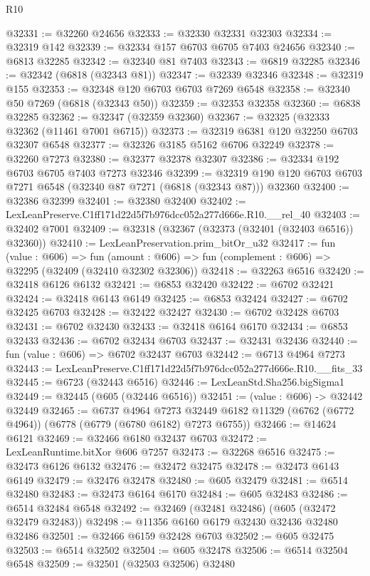 \begin{lexlean}{R10}
\begin{coremodule}
@32331 := @32260 @24656
@32333 := @32330 @32331 @32303
@32334 := @32319 @142
@32339 := @32334 @157 @6703 @6705 @7403 @24656
@32340 := @6813 @32285
@32342 := @32340 @81 @7403
@32343 := @6819 @32285
@32346 := @32342 (@6818 (@32343 @81))
@32347 := @32339 @32346
@32348 := @32319 @155
@32353 := @32348 @120 @6703 @6703 @7269 @6548
@32358 := @32340 @50 @7269 (@6818 (@32343 @50))
@32359 := @32353 @32358
@32360 := @6838 @32285
@32362 := @32347 (@32359 @32360)
@32367 := @32325 (@32333 @32362 (@11461 @7001 @6715))
@32373 := @32319 @6381 @120 @32250 @6703 @32307 @6548
@32377 := @32326 @3185 @5162 @6706 @32249
@32378 := @32260 @7273
@32380 := @32377 @32378 @32307
@32386 := @32334 @192 @6703 @6705 @7403 @7273 @32346
@32399 := @32319 @190 @120 @6703 @6703 @7271 @6548 (@32340 @87 @7271 (@6818 (@32343 @87))) @32360
@32400 := @32386 @32399
@32401 := @32380 @32400
@32402 := LexLeanPreserve.C1ff171d22d5f7b976dcc052a277d666e.R10.__rel_40
@32403 := @32402 @7001
@32409 := @32318 (@32367 (@32373 (@32401 (@32403 @6516)) @32360))
@32410 := LexLeanPreservation.prim_bitOr_u32
@32417 := fun (value : @606) =>
  fun (amount : @606) => fun (complement : @606) => @32295 (@32409 (@32410 @32302 @32306))
@32418 := @32263 @6516
@32420 := @32418 @6126 @6132
@32421 := @6853 @32420
@32422 := @6702 @32421
@32424 := @32418 @6143 @6149
@32425 := @6853 @32424
@32427 := @6702 @32425 @6703
@32428 := @32422 @32427
@32430 := @6702 @32428 @6703
@32431 := @6702 @32430
@32433 := @32418 @6164 @6170
@32434 := @6853 @32433
@32436 := @6702 @32434 @6703
@32437 := @32431 @32436
@32440 := fun (value : @606) => @6702 @32437 @6703
@32442 := @6713 @4964 @7273
@32443 := LexLeanPreserve.C1ff171d22d5f7b976dcc052a277d666e.R10.__fits_33
@32445 := @6723 (@32443 @6516)
@32446 := LexLeanStd.Sha256.bigSigma1
@32449 := @32445 (@605 (@32446 @6516))
@32451 := (value : @606) -> @32442 @32449
@32465 := @6737
    @4964
    @7273
    @32449
    @6182
    @11329
    (@6762 (@6772 @4964))
    (@6778 (@6779 (@6780 @6182) @7273 @6755))
@32466 := @14624 @6121
@32469 := @32466 @6180 @32437 @6703
@32472 := LexLeanRuntime.bitXor @606 @7257
@32473 := @32268 @6516
@32475 := @32473 @6126 @6132
@32476 := @32472 @32475
@32478 := @32473 @6143 @6149
@32479 := @32476 @32478
@32480 := @605 @32479
@32481 := @6514 @32480
@32483 := @32473 @6164 @6170
@32484 := @605 @32483
@32486 := @6514 @32484 @6548
@32492 := @32469 (@32481 @32486) (@605 (@32472 @32479 @32483))
@32498 := @11356 @6160 @6179 @32430 @32436 @32480 @32486
@32501 := @32466 @6159 @32428 @6703
@32502 := @605 @32475
@32503 := @6514 @32502
@32504 := @605 @32478
@32506 := @6514 @32504 @6548
@32509 := @32501 (@32503 @32506) @32480

\end{coremodule}
\end{lexlean}
